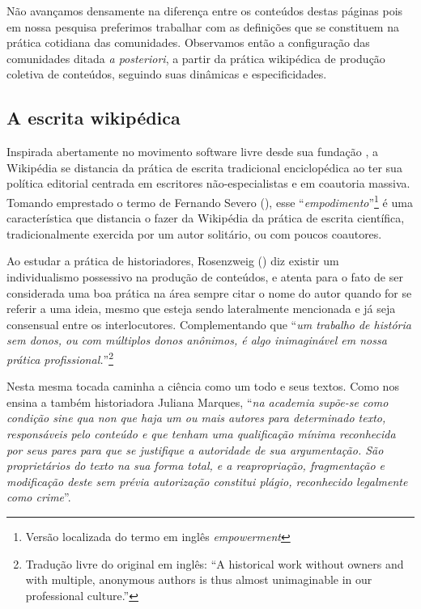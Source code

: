 Não avançamos densamente na diferença entre os conteúdos destas páginas pois em nossa pesquisa preferimos trabalhar com as definições que se constituem na prática cotidiana das comunidades. Observamos então a configuração das comunidades ditada \textit{a posteriori}, a partir da prática wikipédica de produção coletiva de conteúdos, seguindo suas dinâmicas e especificidades.

\subsection{A escrita wikipédica}

Inspirada abertamente no movimento software livre desde sua fundação \citep{lih_wikirevolution_2009}, a Wikipédia se distancia da prática de escrita tradicional enciclopédica ao ter sua política editorial centrada em escritores não-especialistas e em coautoria massiva. Tomando emprestado o termo de Fernando Severo (\citeyear{severo_tics_2016}), esse ``\textit{empodimento}''\footnote{Versão localizada do termo em inglês \textit{empowerment}} é uma característica que distancia o fazer da Wikipédia da prática de escrita científica, tradicionalmente exercida por um autor solitário, ou com poucos coautores.

Ao estudar a prática de historiadores, Rosenzweig (\citeyear{rosenzweig_can_2006}) diz existir um individualismo possessivo na produção de conteúdos, e atenta para o fato de ser considerada uma boa prática na área sempre citar o nome do autor quando for se referir a uma ideia, mesmo que esteja sendo lateralmente mencionada e já seja consensual entre os interlocutores. Complementando que ``\textit{um trabalho de história sem donos, ou com múltiplos donos anônimos, é algo inimaginável em nossa prática profissional.}''\footnote{Tradução livre do original em inglês: ``A historical work without owners and with multiple, anonymous authors is thus almost unimaginable in our professional culture.''} 

Nesta mesma tocada caminha a ciência como um todo e seus textos. Como nos ensina a também historiadora Juliana Marques, ``\textit{na academia supõe-se como condição sine qua non que haja um ou mais autores para determinado texto, responsáveis pelo conteúdo e que tenham uma qualificação mínima reconhecida por seus pares para que se justifique a autoridade de sua argumentação. São proprietários do texto na sua forma total, e a reapropriação, fragmentação e modificação deste sem prévia autorização constitui plágio, reconhecido legalmente como crime}''. \citep[337]{marques_trabalhando_2012}


